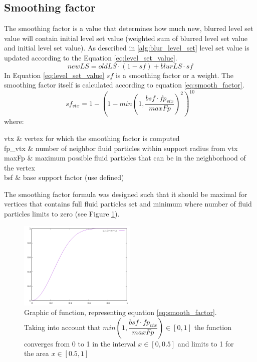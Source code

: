 \subsection{Smoothing factor}
The smoothing factor is a value that determines how much new, blurred level set value will contain initial level set value (weighted sum of blurred level set value and initial level set value). As described in \ref{alg:blur_level_set} level set value is updated according to the Equation \ref{eq:level_set_value}.
\begin{equation}
newLS = oldLS \cdot (1 - sf) + blurLS \cdot sf \label{eq:level_set_value}
\end{equation}
In Equation \ref{eq:level_set_value} $sf$ is a smoothing factor or a weight. The smoothing factor itself is calculated according to equation \ref{eq:smooth_factor}.
\begin{equation}
	sf_{vtx} = 1 - (1 - min(1, \dfrac{bsf \cdot fp_{vtx}}{maxFp})^2)^{10} \label{eq:smooth_factor}
\end{equation}
where:
\begin{conditions}
	vtx & vertex for which the smoothing factor is computed\\
	fp_{vtx} & number of neighbor fluid particles within support radius from vtx\\
	maxFp & maximum possible fluid particles that can be in the neighborhood of the vertex \\
	bsf & base support factor (use defined)
\end{conditions}
The smoothing factor formula was designed such that it should be maximal for vertices that contains full fluid particles set and minimum where number of fluid particles limits to zero (see Figure \ref{fig:sf_function_graph}).
\begin{figure}[H]
	\begin{center}
			\includegraphics[width=0.5\textwidth]{figures/sf_function_graph.png}		
	\end{center}
	\caption{Graphic of function, representing equation \ref{eq:smooth_factor}. Taking into account that $min(1, \dfrac{bsf \cdot fp_{vtx}}{maxFp}) \in [0,1]$ the function converges from 0 to 1 in the interval $x \in [0, 0.5]$ and limits to 1 for the area $x\in [0.5, 1]$}
	\label{fig:sf_function_graph}
\end{figure}


